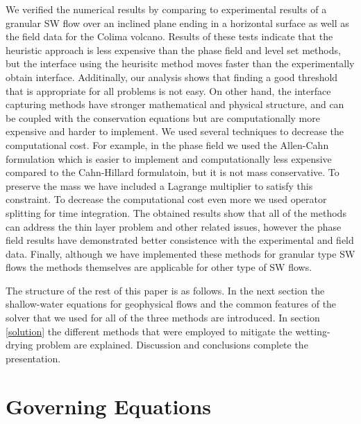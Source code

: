 \documentclass[letterpaper,10pt]{article}
\begin{document}
We verified the numerical results by comparing to experimental results of a granular SW flow over an inclined plane ending in a horizontal surface as well as the field data for the Colima volcano.
Results of these tests indicate that
the heuristic approach is less expensive than the phase field and level set methods, but the interface using the heurisitc method moves faster than the 
experimentally obtain interface. Additinally, our analysis shows that finding a good threshold that is appropriate for all problems is not easy. 
On other hand, the interface capturing methods have stronger mathematical and physical structure, and can be coupled with the conservation equations but are computationally more expensive and harder 
to implement. We used several techniques to decrease the computational cost. For example, in the phase field we used the Allen-Cahn formulation which is easier to implement and computationally less 
expensive compared to the Cahn-Hillard formulatoin, but it is not mass conservative. To preserve the mass we have included a Lagrange multiplier to satisfy this constraint. 
To decrease the computational cost even more we used operator splitting for time integration. The obtained results show that all of the methods can address the thin layer problem and other 
related issues, however the phase field results have demonstrated better consistence with the experimental and field data. 
Finally, although we have implemented these methods for granular type SW flows the methods themselves are applicable for other type of SW flows.  

The structure of the rest of this paper is as follows. In the next section the shallow-water equations for geophysical flows and 
the common features of the solver that we used for all of the three methods are 
introduced. In section \ref{solution} the different methods that were employed to mitigate the wetting-drying problem are explained. 
Discussion and conclusions complete the presentation.

\section{Governing Equations } \label{Method}

\end{document}
